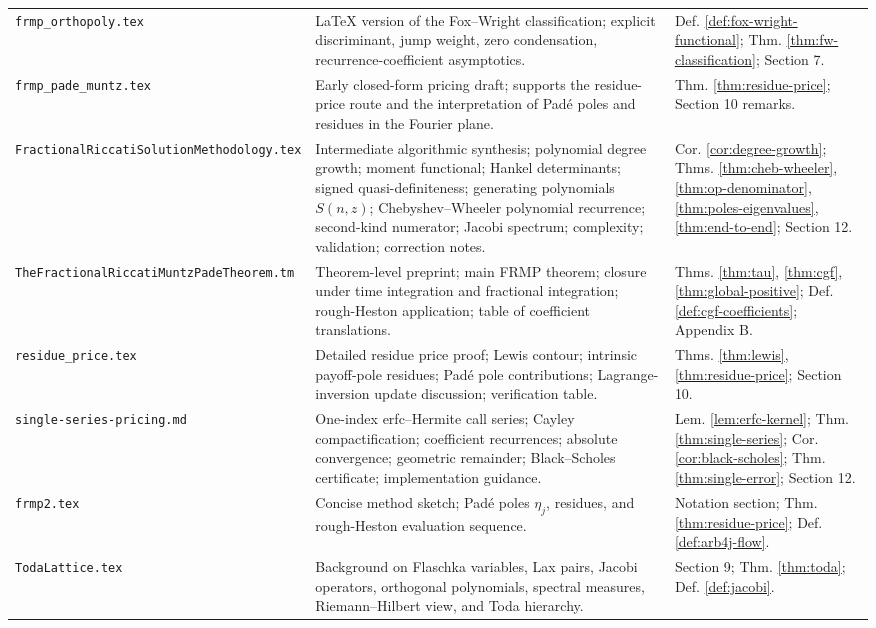 \documentclass[11pt]{article}
\theoremstyle{definition}
\begin{document}
\begin{longtable}{p{}p{}p{}}
\texttt{frmp\_orthopoly.tex} & LaTeX version of the Fox--Wright classification; explicit discriminant, jump weight, zero condensation, recurrence-coefficient asymptotics. & Def. \ref{def:fox-wright-functional}; Thm. \ref{thm:fw-classification}; Section 7.\\
\texttt{frmp\_pade\_muntz.tex} & Early closed-form pricing draft; supports the residue-price route and the interpretation of Padé poles and residues in the Fourier plane. & Thm. \ref{thm:residue-price}; Section 10 remarks.\\
\texttt{FractionalRiccatiSolutionMethodology.tex} & Intermediate algorithmic synthesis; polynomial degree growth; moment functional; Hankel determinants; signed quasi-definiteness; generating polynomials $S(n,z)$; Chebyshev--Wheeler polynomial recurrence; second-kind numerator; Jacobi spectrum; complexity; validation; correction notes. & Cor. \ref{cor:degree-growth}; Thms. \ref{thm:cheb-wheeler}, \ref{thm:op-denominator}, \ref{thm:poles-eigenvalues}, \ref{thm:end-to-end}; Section 12.\\
\texttt{TheFractionalRiccatiMuntzPadeTheorem.tm} & Theorem-level preprint; main FRMP theorem; closure under time integration and fractional integration; rough-Heston application; table of coefficient translations. & Thms. \ref{thm:tau}, \ref{thm:cgf}, \ref{thm:global-positive}; Def. \ref{def:cgf-coefficients}; Appendix B.\\
\texttt{residue\_price.tex} & Detailed residue price proof; Lewis contour; intrinsic payoff-pole residues; Padé pole contributions; Lagrange-inversion update discussion; verification table. & Thms. \ref{thm:lewis}, \ref{thm:residue-price}; Section 10.\\
\texttt{single-series-pricing.md} & One-index erfc--Hermite call series; Cayley compactification; coefficient recurrences; absolute convergence; geometric remainder; Black--Scholes certificate; implementation guidance. & Lem. \ref{lem:erfc-kernel}; Thm. \ref{thm:single-series}; Cor. \ref{cor:black-scholes}; Thm. \ref{thm:single-error}; Section 12.\\
\texttt{frmp2.tex} & Concise method sketch; Padé poles $\eta_j$, residues, and rough-Heston evaluation sequence. & Notation section; Thm. \ref{thm:residue-price}; Def. \ref{def:arb4j-flow}.\\
\texttt{TodaLattice.tex} & Background on Flaschka variables, Lax pairs, Jacobi operators, orthogonal polynomials, spectral measures, Riemann--Hilbert view, and Toda hierarchy. & Section 9; Thm. \ref{thm:toda}; Def. \ref{def:jacobi}.\\
\bottomrule
\end{longtable}
\end{document}
